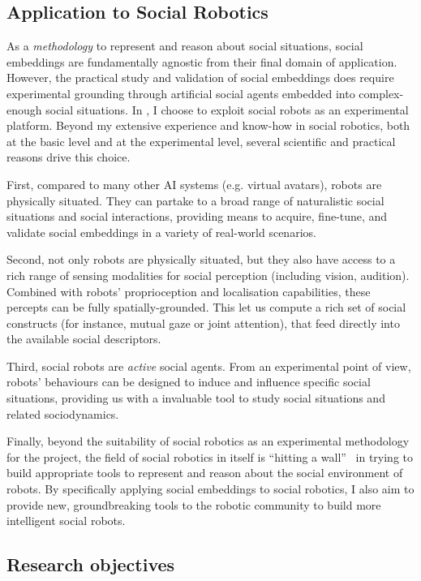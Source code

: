 \subsection{Application to Social Robotics}

As a \emph{methodology} to represent and reason about social situations, social
embeddings are fundamentally agnostic from their final domain of application.
However, the practical study and validation of social embeddings does require
experimental grounding through artificial social agents embedded into
complex-enough social situations. In \project, I choose to exploit social robots
as an experimental platform.  Beyond my extensive experience and know-how in
social robotics, both at the basic level and at the experimental level, several
scientific and practical reasons drive this choice.

First, compared to many other AI systems (e.g. virtual avatars), robots
are physically situated.  They can partake to a broad range of naturalistic
social situations and social interactions, providing means to acquire,
fine-tune, and validate social embeddings in a variety of real-world scenarios.

Second, not only robots are physically situated, but they also have access to a rich
range of sensing modalities for social perception (including vision, audition).
Combined with robots' proprioception and localisation capabilities, these
percepts can be fully spatially-grounded. This let us compute a rich set of
social constructs (for instance, mutual gaze or joint attention), that feed
directly into the available social descriptors.

Third, social robots are \emph{active} social agents. From an experimental point
of view, robots' behaviours can be
designed to induce and influence specific social situations, providing us with a
invaluable tool to study social situations and related sociodynamics.

Finally, beyond the suitability of social robotics as an experimental
methodology for the \project project, the field of social robotics in itself is
``hitting a wall''~\cite{yang2018grand} in trying to build appropriate tools to represent and
reason about the social environment of robots. By specifically applying social
embeddings to social robotics, I also aim to provide new, groundbreaking
tools to the robotic community to build more intelligent social robots.

\subsection{Research objectives}

